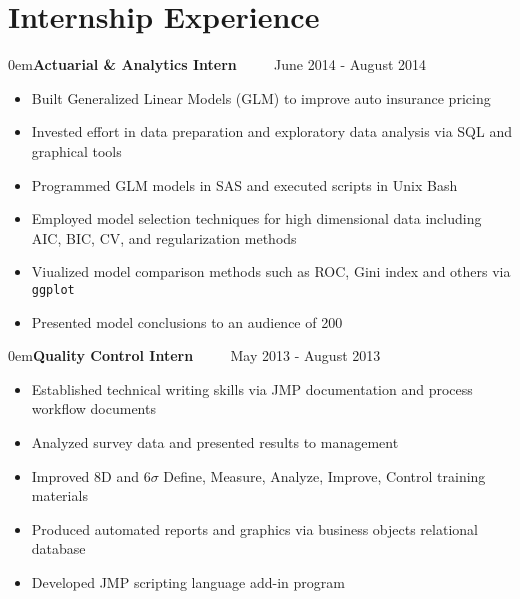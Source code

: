 \documentclass[10pt]{article}
\newenvironment{am}{\begin{addmargin}[1em]{0em}}{\end{addmargin}}
\newcommand{\Experience}[3]{\begin{am}\textbf{#1} \ \ \ \ \emph{{\color{LightGray}{#2}}} \hfill {#3} \end{am}}
\begin{document}
\section*{Internship Experience}

\Experience{Actuarial \& Analytics Intern}{Travelers Insurance}{June 2014 - August 2014}
\begin{itemize}[noitemsep]
 \item Built Generalized Linear Models (GLM) to improve auto insurance pricing
\item Invested effort in data preparation and exploratory data analysis via SQL and graphical tools
\item Programmed GLM models in SAS and executed scripts in Unix Bash
\item Employed model selection techniques for high dimensional data including
  AIC, BIC, CV, and regularization methods
\item Viualized model comparison methods such as ROC, Gini index and others via
  \texttt{ggplot}
\item Presented model conclusions to an audience of 200
\end{itemize}


\Experience{Quality Control Intern}{Seagate Technology}{May 2013 - August 2013}
\begin{itemize}[noitemsep]
 \item Established technical writing skills via JMP documentation and process workflow documents
 \item Analyzed survey data and presented results to management
 \item Improved 8D and 6$\sigma$ Define, Measure, Analyze, Improve, Control training materials
 \item Produced automated reports and graphics via business objects relational database
 \item Developed JMP scripting language add-in program
\end{itemize}
\end{document}
